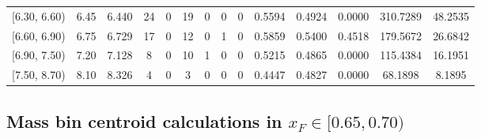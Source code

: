 \begin{table}[htbp]
{\begin{tabular}{cc|c|cccccc|ccc|cc}
        {[6.30, 6.60)} & 6.45 & 6.440 & 24 & 0 & 19 & 0 & 0 & 0 & 0.5594 & 0.4924 & 0.0000 & 310.7289 & 48.2535 \\
        {[6.60, 6.90)} & 6.75 & 6.729 & 17 & 0 & 12 & 0 & 1 & 0 & 0.5859 & 0.5400 & 0.4518 & 179.5672 & 26.6842 \\
        {[6.90, 7.50)} & 7.20 & 7.128 & 8 & 0 & 10 & 1 & 0 & 0 & 0.5215 & 0.4865 & 0.0000 & 115.4384 & 16.1951 \\
        {[7.50, 8.70)} & 8.10 & 8.326 & 4 & 0 & 3 & 0 & 0 & 0 & 0.4447 & 0.4827 & 0.0000 & 68.1898 & 8.1895 \\
        \hline\hline
    \end{tabular}
    }
\end{table}

\clearpage
\subsection{\texorpdfstring{Mass bin centroid calculations in $x_F \in [0.65, 0.70)$}{Mass bin centroid calculations in x\_F in [0.65, 0.70)]}}

